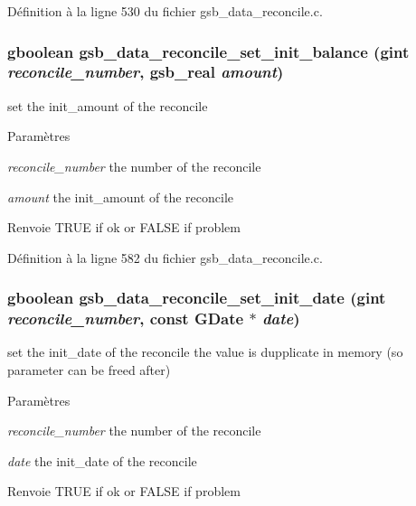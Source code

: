 Définition à la ligne 530 du fichier gsb\_\-data\_\-reconcile.c.

\subsubsection[{gsb\_\-data\_\-reconcile\_\-set\_\-init\_\-balance}]{\setlength{\rightskip}{0pt plus 5cm}gboolean gsb\_\-data\_\-reconcile\_\-set\_\-init\_\-balance (gint {\em reconcile\_\-number}, \/  {\bf gsb\_\-real} {\em amount})}\label{gsb__data__reconcile_8c_ae00b62ef7aed10eaa1436c833fe8da0c}
set the init\_\-amount of the reconcile


\begin{DoxyParams}{Paramètres}
\item[{\em reconcile\_\-number}]the number of the reconcile \item[{\em amount}]the init\_\-amount of the reconcile\end{DoxyParams}
\begin{DoxyReturn}{Renvoie}
TRUE if ok or FALSE if problem 
\end{DoxyReturn}


Définition à la ligne 582 du fichier gsb\_\-data\_\-reconcile.c.

\subsubsection[{gsb\_\-data\_\-reconcile\_\-set\_\-init\_\-date}]{\setlength{\rightskip}{0pt plus 5cm}gboolean gsb\_\-data\_\-reconcile\_\-set\_\-init\_\-date (gint {\em reconcile\_\-number}, \/  const GDate $\ast$ {\em date})}\label{gsb__data__reconcile_8c_a804d3e97ad7b144a45a11f9786cc1b80}
set the init\_\-date of the reconcile the value is dupplicate in memory (so parameter can be freed after)


\begin{DoxyParams}{Paramètres}
\item[{\em reconcile\_\-number}]the number of the reconcile \item[{\em date}]the init\_\-date of the reconcile\end{DoxyParams}
\begin{DoxyReturn}{Renvoie}
TRUE if ok or FALSE if problem 
\end{DoxyReturn}


